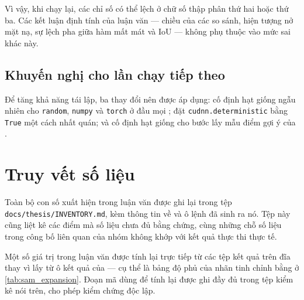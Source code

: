 Vì vậy, khi chạy lại, các chỉ số có thể lệch ở chữ số thập phân thứ hai hoặc thứ
ba. Các kết luận định tính của luận văn --- chiều của các so sánh, hiện tượng nở
mặt nạ, sự lệch pha giữa hàm mất mát và IoU --- không phụ thuộc vào mức sai khác
này.

\subsection{Khuyến nghị cho lần chạy tiếp theo}

Để tăng khả năng tái lập, ba thay đổi nên được áp dụng: cố định hạt giống ngẫu
nhiên cho \texttt{random}, \texttt{numpy} và \texttt{torch} ở đầu mọi
; đặt \texttt{cudnn.\allowbreak deterministic} bằng \texttt{True} một cách nhất
quán; và cố định hạt giống cho bước lấy mẫu điểm gợi ý của \SAM{}.

\section{Truy vết số liệu}

Toàn bộ con số xuất hiện trong luận văn được ghi lại trong tệp
\texttt{docs/\allowbreak thesis/\allowbreak INVENTORY.\allowbreak md}, kèm thông tin về  và ô lệnh đã
sinh ra nó. Tệp này cũng liệt kê các điểm mà số liệu chưa đủ bằng chứng, cùng
những chỗ số liệu trong công bố liên quan của nhóm không khớp với kết quả thực
thi thực tế.

Một số giá trị trong luận văn được tính lại trực tiếp từ các tệp kết quả trên đĩa
thay vì lấy từ ô kết quả của  --- cụ thể là bảng độ phủ của nhãn tinh
chỉnh bằng \SAM{} ở \cref{tab:sam_expansion}. Đoạn mã dùng để tính lại được ghi
đầy đủ trong tệp kiểm kê nói trên, cho phép kiểm chứng độc lập.
